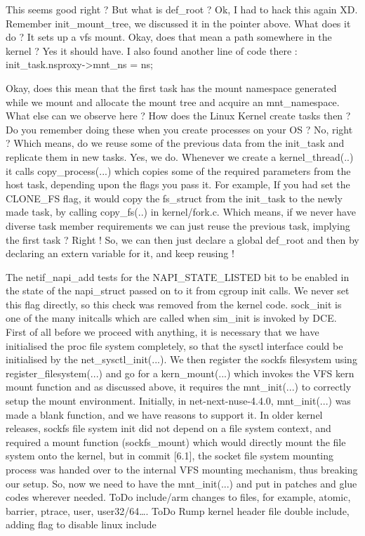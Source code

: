 \documentclass{sig-alternate}
\begin{document}
This seems good right ? But what  is def\_root ? Ok, I had to hack this again XD.
Remember init\_mount\_tree, we discussed it in the pointer above. What does it do ?  It sets up a vfs mount. Okay, does that mean a path somewhere 
in the kernel ? Yes it should have. I also found another line of code there : 
init\_task.nsproxy->mnt\_ns = ns;

Okay, does this mean that the first task has the mount namespace generated while we mount and allocate the mount tree and acquire an mnt\_namespace. 
What else can we observe here ? How does the Linux Kernel create tasks then ? Do you remember doing these when you create processes on your OS ? 
No, right ? Which means, do we reuse some of the previous data from the init\_task and replicate them in new tasks. Yes, we do. Whenever we create 
a kernel\_thread(..) it calls copy\_process(...) which copies some of the required parameters from the host task, depending upon the flags you pass 
it. For example, If you had set the CLONE\_FS flag, it would copy the fs\_struct from the init\_task to the newly made task, by calling copy\_fs(..)
in kernel/fork.c. Which means, if we never have diverse task member requirements we can just reuse the previous task, implying the first task ?  
Right ! So, we can then just declare a global def\_root and then by declaring an extern variable for it, and keep reusing !

The netif\_napi\_add tests for the NAPI\_STATE\_LISTED bit to be enabled in the state of the napi\_struct passed on to it from cgroup init calls. 
We never set this flag directly, so this check was removed from the kernel code. sock\_init is one of the many initcalls which are called when 
sim\_init is invoked by DCE. First of all before we proceed with anything, it is necessary that we have initialised the proc file system completely,
so that the sysctl interface could be initialised by the net\_sysctl\_init(...). We then register the sockfs filesystem using register\_filesystem(...) 
and go for a kern\_mount(...) which invokes the VFS kern mount function and as discussed above, it requires the mnt\_init(...) to correctly setup 
the mount environment. Initially, in net-next-nuse-4.4.0, mnt\_init(...)  was made a blank function, and we have reasons to support it. 
In older kernel releases, sockfs file system init did not depend on a file system context, and required a mount function (sockfs\_mount) which 
would directly mount the file system onto the kernel, but in commit [6.1], the socket file system mounting process was handed over to the 
internal VFS mounting mechanism, thus breaking our setup. So, now we need to have the mnt\_init(...) and put in patches and glue codes wherever 
needed. ToDo include/arm changes to files, for example, atomic, barrier, ptrace, user, user32/64….
ToDo Rump kernel header file double include, adding flag to disable linux include
\end{document}
